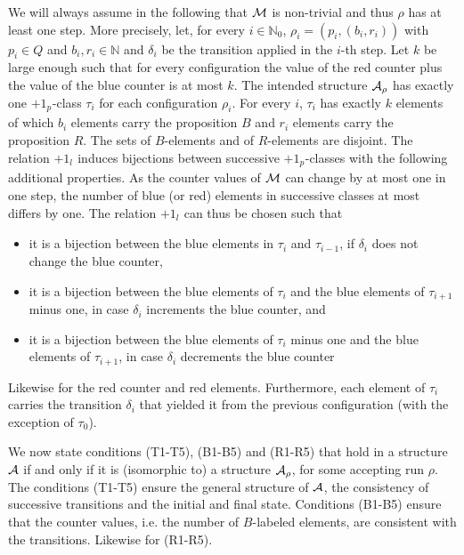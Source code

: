 \documentclass[11pt, a4paper]{article}
\renewcommand{\(}{\left (}
\renewcommand{\)}{\right )}
\theoremstyle{plain}
\newcommand{\psucc}[1][]{\ensuremath{{+1}_{p_{#1}}}}
\newcommand{\lsucc}[1][]{\ensuremath{{+1_{l_{#1}}}}}
\newcommand {\calA}      {{\cal A}\xspace}
\newcommand {\calM}      {{\cal M}\xspace}
\newcommand  {\N}   {\ensuremath{\mathbb{N}}}
\begin{document}
{We will always assume in the following that $\calM$ is non-trivial and thus $\rho$ has at least one step.
More precisely, let,   for every $i\in\N_0$, $\rho_i = (p_i, (b_i, r_i))$ with $p_i \in Q$ and $b_i, r_i \in \N$ and $\delta_i$ be the transition applied in the $i$-th step. Let $k$ be large enough such that for every configuration the value of the red counter plus the value of the blue counter is at most $k$.
The intended structure $\calA_\rho$ has exactly one $\psucc$-class $\tau_i$ for each configuration $\rho_i$. 
For every $i$, $\tau_i$ has exactly $k$ elements of which $b_i$ elements carry the proposition $B$ and $r_i$ elements carry the proposition $R$. The sets of $B$-elements and of $R$-elements are disjoint. 
The relation $\lsucc$ induces bijections between successive $\psucc$-classes with the following additional properties. As the counter values of $\calM$ can change by at most one in one step, the number of blue (or red) elements in successive classes at most differs by one. The relation $\lsucc$ can thus be chosen such that 
\begin{itemize}
\item it is a bijection between the blue elements in $\tau_i$ and
  $\tau_{i-1}$, if $\delta_i$ does not change the blue counter,
\item it is a bijection between the blue elements of $\tau_i$ and the blue
  elements of $\tau_{i+1}$ minus one, in case $\delta_i$ increments
  the blue counter, and
\item  it is a bijection between the blue elements of $\tau_i$ minus one and the blue
  elements of $\tau_{i+1}$, in case $\delta_i$ decrements
  the blue counter
\end{itemize}
Likewise for the red counter and red elements.  Furthermore, each element of $\tau_i$ carries the transition $\delta_{i}$ that yielded it from the previous configuration (with the exception of $\tau_0$).  



 We now state conditions (T1-T5), (B1-B5) and (R1-R5) that hold in a structure $\calA$ if and only if it is (isomorphic to) a structure $\calA_\rho$, for some accepting run $\rho$.  The conditions (T1-T5) ensure the general structure of $\calA$, the consistency of successive transitions and the initial and final state. Conditions (B1-B5) ensure that the counter values, i.e. the number of $B$-labeled elements, are consistent with the transitions. Likewise for (R1-R5).

}
\end{document}
